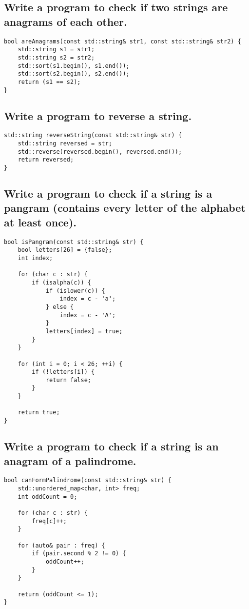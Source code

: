 \subsection{Write a program to check if two strings are anagrams of each other.}
\begin{tcolorbox}[title=]
\begin{verbatim}
bool areAnagrams(const std::string& str1, const std::string& str2) {
    std::string s1 = str1;
    std::string s2 = str2;
    std::sort(s1.begin(), s1.end());
    std::sort(s2.begin(), s2.end());
    return (s1 == s2);
}
\end{verbatim}
\end{tcolorbox}

\subsection{Write a program to reverse a string.}
\begin{tcolorbox}[title=]
\begin{verbatim}
std::string reverseString(const std::string& str) {
    std::string reversed = str;
    std::reverse(reversed.begin(), reversed.end());
    return reversed;
}
\end{verbatim}
\end{tcolorbox}

\subsection{Write a program to check if a string is a pangram (contains every letter of the alphabet at least once).}
\begin{tcolorbox}[title=]
\begin{verbatim}
bool isPangram(const std::string& str) {
    bool letters[26] = {false};
    int index;

    for (char c : str) {
        if (isalpha(c)) {
            if (islower(c)) {
                index = c - 'a';
            } else {
                index = c - 'A';
            }
            letters[index] = true;
        }
    }

    for (int i = 0; i < 26; ++i) {
        if (!letters[i]) {
            return false;
        }
    }

    return true;
}
\end{verbatim}
\end{tcolorbox}

\subsection{Write a program to check if a string is an anagram of a palindrome.}
\begin{tcolorbox}[title=]
\begin{verbatim}
bool canFormPalindrome(const std::string& str) {
    std::unordered_map<char, int> freq;
    int oddCount = 0;

    for (char c : str) {
        freq[c]++;
    }

    for (auto& pair : freq) {
        if (pair.second % 2 != 0) {
            oddCount++;
        }
    }

    return (oddCount <= 1);
}
\end{verbatim}
\end{tcolorbox}